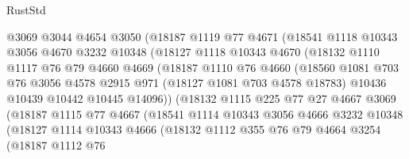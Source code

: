 \begin{lexlean}{RustStd}
\begin{coremodule}
                  @3069
                  @3044
                  @4654
                  @3050
                  (@18187
                    @1119
                    @77
                    @4671
                    (@18541
                      @1118
                      @10343
                      @3056
                      @4670
                      @3232
                      @10348
                      (@18127
                        @1118
                        @10343
                        @4670
                        (@18132
                          @1110
                          @1117
                          @76
                          @79
                          @4660
                          @4669
                          (@18187
                            @1110
                            @76
                            @4660
                            (@18560
                              @1081
                              @703
                              @76
                              @3056
                              @4578
                              @2915
                              @971
                              (@18127 @1081 @703 @4578 @18783)
                              @10436
                              @10439
                              @10442
                              @10445
                              @14096))
                          (@18132
                            @1115
                            @225
                            @77
                            @27
                            @4667
                            @3069
                            (@18187
                              @1115
                              @77
                              @4667
                              (@18541
                                @1114
                                @10343
                                @3056
                                @4666
                                @3232
                                @10348
                                (@18127
                                  @1114
                                  @10343
                                  @4666
                                  (@18132
                                    @1112
                                    @355
                                    @76
                                    @79
                                    @4664
                                    @3254
                                    (@18187
                                      @1112
                                      @76

\end{coremodule}
\end{lexlean}
